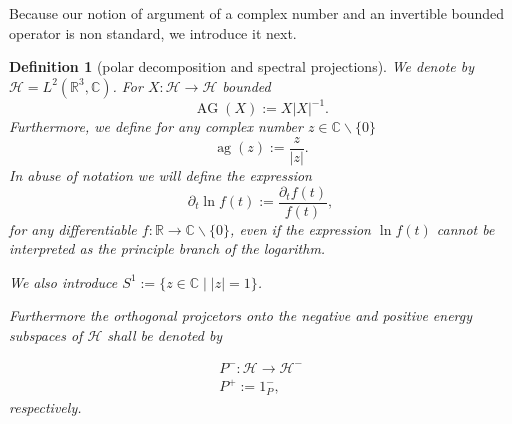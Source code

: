 \documentclass[b5paper,draft,openbib,12pt]{memoir}
\newtheorem{Def}{Definition}
\DeclareMathOperator{\ag}{ag}
\DeclareMathOperator{\AG}{AG}
\begin{document}
Because our notion of argument of a complex number and an 
invertible bounded operator is non standard, we introduce it next. 
\begin{Def}[polar decomposition and spectral projections]
We denote by \(\mathcal{H}=L^2(\mathbb{R}^3,\mathbb{C})\).
For \(X:\mathcal{H}\rightarrow \mathcal{H}\) bounded
\begin{equation}\label{def AG}
\AG(X):=X |X|^{-1}.
\end{equation}
Furthermore, we define for any complex number \(z\in \mathbb{C}\backslash \{0\}\)
\begin{equation}
\ag(z):=\frac{z}{|z|}.
\end{equation}
In abuse of notation we will define the expression
\begin{equation}
\partial_t \ln f(t):=\frac{\partial_t f(t)}{f(t)},
\end{equation}
for any differentiable \(f:\mathbb{R}\rightarrow \mathbb{C}\backslash \{0\} \), 
even if the expression \(\ln f(t)\) cannot be interpreted as the principle
branch of the logarithm.

We also introduce \(S^1:=\{z\in\mathbb{C}\mid |z|=1\}\).

Furthermore the orthogonal projcetors onto the negative and
positive energy
subspaces of \(\mathcal{H}\) shall be denoted by 

\begin{align}
P^-:\mathcal{H}\rightarrow \mathcal{H}^-\\
P^+:=1_P^-,
\end{align}
respectively.


\end{Def}
\end{document}
